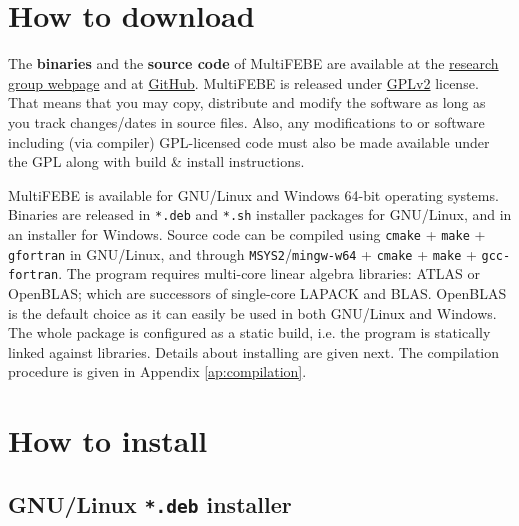 \documentclass[a4paper,fleqn]{book}
\begin{document}
%
%

%
%

\section{How to download}

The \textbf{binaries} and the \textbf{source code} of MultiFEBE are available at the \href{http://www.mmc.siani.es/}{research group webpage} and at \href{https://github.com/mmc-siani-es/MultiFEBE}{GitHub}. MultiFEBE is released under \href{https://github.com/mmc-siani-es/MultiFEBE/blob/main/LICENSE}{GPLv2} license. That means that you may copy, distribute and modify the software as long as you track changes/dates in source files. Also, any modifications to or software including (via compiler) GPL-licensed code must also be made available under the GPL along with build \& install instructions.

MultiFEBE is available for GNU/Linux and Windows 64-bit operating systems. Binaries are released in \texttt{*.deb} and \texttt{*.sh} installer packages for GNU/Linux, and in an  installer for Windows. Source code can be compiled using \texttt{cmake} + \texttt{make} + \texttt{gfortran} in GNU/Linux, and through \texttt{MSYS2}/\texttt{mingw-w64} + \texttt{cmake} + \texttt{make} + \texttt{gcc-fortran}. The program requires multi-core linear algebra libraries: ATLAS or OpenBLAS; which are successors of single-core LAPACK and BLAS. OpenBLAS is the default choice as it can easily be used in both GNU/Linux and Windows. The whole package is configured as a static build, i.e. the program is statically linked against libraries. Details about installing are given next. The compilation procedure is given in Appendix \ref{ap:compilation}.

\section{How to install}

\subsection{GNU/Linux \texttt{*.deb} installer}
\end{document}
